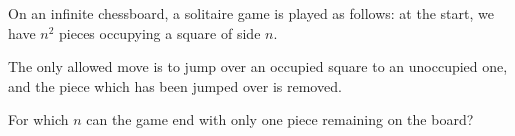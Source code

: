 On an infinite chessboard, a solitaire game is played as follows: at the start, we have $n^2$ pieces occupying a square of side $n.$

 The only allowed move is to jump over an occupied square to an 
unoccupied one, and the piece which has been jumped over is removed.

For which $n$ can the game end with only one piece remaining on the board?
